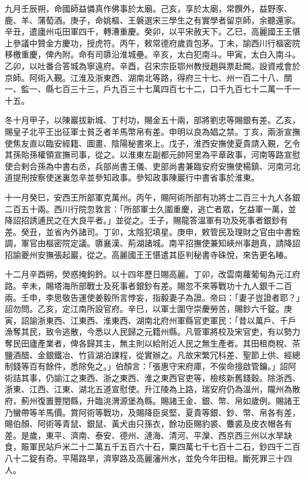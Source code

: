 \begin{pinyinscope}
 九月壬辰朔，命國師益憐真作佛事於太廟。己亥，享於太廟，常饌外，益野豕、鹿、羊、蒲萄酒。庚子，命姚樞、王磐選宋三學生之有實學者留京師，余聽還家。辛丑，遣廬州屯田軍四千，轉漕重慶。癸卯，以平宋赦天下。乙巳，高麗國王王愖上參議中贊金方慶功，授虎符。丙午，敕常德府歲貢包茅。丁未，諭西川行樞密院移檄重慶，俾內附。命有司隳沿淮城壘。辛亥，太白犯南斗。甲寅，太白入南斗。乙卯，以吐番合答城為寧遠府。辛酉，召宋宗臣鄂州教授趙與票赴闕。設資戒會於京師。阿術入覲。江淮及浙東西、湖南北等路，得府三十七、州一百二十八、關一、監一、縣七百三十三，戶九百三十七萬四百七十二，口千九百七十二萬一千一十五。



 冬十月甲子，以陳巖拔新城、丁村功，賜金五十兩，部將劉忠等賜銀有差。乙亥，賜皇子北平王出征軍士貧乏者羊馬幣帛有差。申明以良為娼之禁。丁亥，兩浙宣撫使焦友直以臨安經籍、圖畫、陰陽秘書來上。戊子，淮西安撫使夏貴請入覲，乞令其孫貽孫權領宣撫司事，從之。以淮東左副都元帥阿里為平章政事，河南等路宣慰使合剌合孫為中書右丞，兵部尚書王儀、吏部尚書兼臨安府安撫使楊鎮、河南河北道提刑按察使迷裏忽辛並參知政事。參知政事陳巖行中書省事於淮東。



 十一月癸巳，安西王所部軍克萬州。丙午，賜阿術所部有功將士二百三十九人各銀二百五十兩。西川行院忽敦言：「所部軍士久圍重慶，逃亡者眾，乞益軍一萬，並降詔招誘逋民之在大良平者。」並從之。壬子，賜龍答溫軍有功及死事者銀鈔有差。癸丑，並省內外諸司。丁卯，太陰犯填星。庚申，敕管民及理財之官由中書銓調，軍官由樞密院定議。隳襄漢、荊湖諸城。南平招撫使兼知峽州事趙真，請降詔招諭夔州安撫張起巖，從之。高麗國王王愖遣其臣判秘書寺硃悅，來告更名睶。



 十二月辛酉朔，熒惑掩鉤鈐。以十四年歷日賜高麗。丁卯，改雲南蘿葡甸為元江府路。辛未，賜塔海所部戰士及死事者銀鈔有差。賜忽不來等戰功十九人銀千二百兩。壬申，李思敬告運使姜毅所言悖妄，指毅妻子為證。帝曰：「妻子豈證者耶？」詔勿問。乙亥，定江南所設官府。辛巳，以軍士圍守崇慶勞苦，賜鈔六千錠。庚寅，詔諭浙東西、江東西、淮東西、湖南北府州軍縣官吏軍民：「昔以萬戶、千戶漁奪其民，致令逃散，今悉以人民歸之元籍州縣。凡管軍將校及宋官吏，有以勢力奪民田廬產業者，俾各歸其主，無主則以給附近人民之無生產者。其田租商稅、茶鹽酒醋、金銀鐵冶、竹貨湖泊課程，從實辦之。凡故宋繁冗科差、聖節上供、經總制錢等百有餘件，悉除免之。」伯顏言：「張惠守宋府庫，不俟命擅啟管鑰。」詔阿術詰其事，仍諭江之東西、浙之東西、淮之東西官吏等，檢核新舊錢穀。除浙西、浙東、江西、江東、湖北五道宣慰使。升江陵為上路，瑞安府仍為溫州，隴州為散府，薊州復置豐閏縣，升臨洮渭源堡為縣。賜諸王金、銀、幣、帛如歲例。賜諸王乃蠻帶等羊馬價。賞阿術等戰功，及賜降臣吳堅、夏貴等銀、鈔、幣、帛各有差，賜伯顏、阿術等青鼠、銀鼠、黃犬由只孫衣，餘功臣賜豹裘、麞裘及皮衣帽各有差。是歲，東平、濟南、泰安、德州、漣海、清河、平灤、西京西三州以水旱缺食，賑軍民站戶米二十二萬五千五百六十石，粟四萬七千七百十二石，鈔四千二百八十二錠有奇。平陽路旱，濟寧路及高麗瀋州水，並免今年田租。斷死罪三十四人。




\end{pinyinscope}
